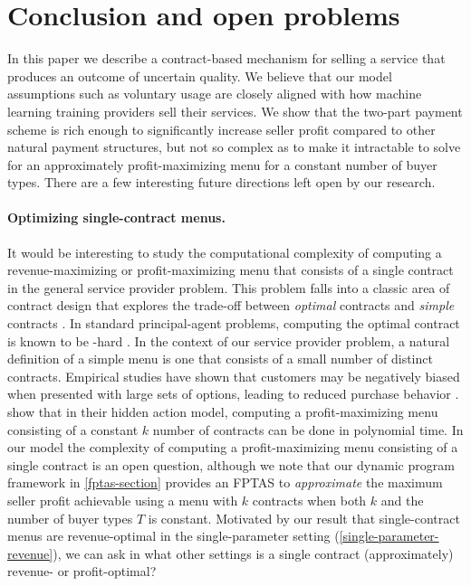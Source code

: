 \section{Conclusion and open problems}

In this paper we describe a contract-based mechanism for selling a service that produces an outcome of uncertain quality. We believe that our model assumptions such as voluntary usage are closely aligned with how machine learning training providers sell their services. We show that the two-part payment scheme is rich enough to significantly increase seller profit compared to other natural payment structures, but not so complex as to make it intractable to solve for an approximately profit-maximizing menu for a constant number of buyer types. There are a few interesting future directions left open by our research.

\paragraph{Optimizing single-contract menus.} It would be interesting to study the computational complexity of computing a revenue-maximizing or profit-maximizing menu that consists of a single contract in the general service provider problem. This problem falls into a classic area of contract design that explores the trade-off between \emph{optimal} contracts and \emph{simple} contracts \citep{dutting2019simple, guruganesh2023menus, dutting2024algorithmic}. In standard principal-agent problems, computing the optimal contract is known to be -hard \citep{guruganesh2021contracts, castiglioni2022bayesian}.
In the context of our service provider problem, a natural definition of a simple menu is one that consists of a small number of distinct contracts. Empirical studies have shown that customers may be negatively biased when presented with large sets of options, leading to reduced purchase behavior \citep{thaler2015misbehaving}. \citet{bernasconi2024agent} show that in their hidden action model, computing a profit-maximizing menu consisting of a constant $k$ number of contracts can be done in polynomial time. In our model the complexity of computing a profit-maximizing menu consisting of a single contract is an open question, although we note that our dynamic program framework in \cref{fptas-section} provides an FPTAS to \emph{approximate} the maximum seller profit achievable using a menu with $k$ contracts when both $k$ and the number of buyer types $T$ is constant. Motivated by our result that single-contract menus are revenue-optimal in the single-parameter setting (\cref{single-parameter-revenue}), we can ask in what other settings is a single contract (approximately) revenue- or profit-optimal?

